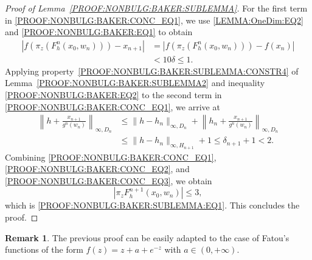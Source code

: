 \documentclass[a4paper, 12pt, twoside]{amsart}
\theoremstyle{definition}
\newtheorem{rem}[thm]{Remark}
\numberwithin{equation}{section}
\begin{document}
\begin{proof}[Proof of Lemma~\ref{PROOF:NONBULG:BAKER:SUBLEMMA}]
        For the first term in \eqref{PROOF:NONBULG:BAKER:CONC_EQ1}, we use \eqref{LEMMA:OneDim:EQ2} and \eqref{PROOF:NONBULG:BAKER:EQ1} to obtain
        \begin{equation}
            \label{PROOF:NONBULG:BAKER:CONC_EQ2}
            \begin{split}
                |{f(\pi_z (F_h^{n}(x_0, w_n))) - x_{n+1}}| &= |{f(\pi_z (F_h^{n}(x_0, w_n))) - f(x_n)}|\\
                &< 10 \delta \leq 1.
            \end{split}
        \end{equation}
        Applying property~\eqref{PROOF:NONBULG:BAKER:SUBLEMMA:CONSTR4} of Lemma~\ref{PROOF:NONBULG:BAKER:SUBLEMMA2} and inequality \eqref{PROOF:NONBULG:BAKER:EQ2} to the second term in \eqref{PROOF:NONBULG:BAKER:CONC_EQ1}, we arrive at
        \begin{equation}
            \label{PROOF:NONBULG:BAKER:CONC_EQ3}
            \begin{split}
                \left\|{h +  \frac{x_{n+1}}{g^n(w_n)}}\right\|_{\infty, D_{n}} &\leq \|{h - h_{n}}\|_{\infty, D_{n}} + \left\|{h_n + \frac{x_{n+1}}{g^n(w_n)}}\right\|_{\infty, D_{n}} \\
                &\leq \|{h - h_{n}}\|_{\infty, H_{n+1}} + 1
                \leq \delta_{n+1} + 1 < 2.
            \end{split}
        \end{equation}
        Combining \eqref{PROOF:NONBULG:BAKER:CONC_EQ1}, \eqref{PROOF:NONBULG:BAKER:CONC_EQ2}, and \eqref{PROOF:NONBULG:BAKER:CONC_EQ3}, we obtain
        \begin{equation*}
            |{\pi_z F_h^{n+1}(x_0, w_n)}| \leq 3,
        \end{equation*} 
        which is \eqref{PROOF:NONBULG:BAKER:SUBLEMMA:EQ1}. This concludes the proof.
    \end{proof}

\begin{rem} The previous proof can be easily adapted to the case of Fatou's functions of the form $f(z)=  z + a + e^{-z}$ with $a\in(0,+\infty)$. 
\end{rem}


 


\end{document}
